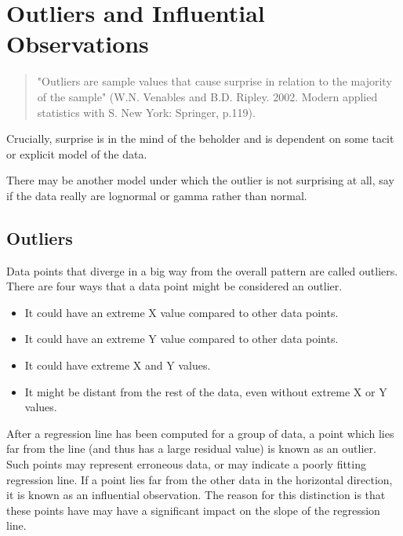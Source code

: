 \documentclass[residuals.tex]{subfiles}
\begin{document}
\newpage
\section{Outliers and Influential Observations}
\begin{quote}
	"Outliers are sample values that cause surprise in relation to the majority of the sample" (W.N. Venables and B.D. Ripley. 2002. Modern applied statistics with S. New York: Springer, p.119).
\end{quote}

Crucially, surprise is in the mind of the beholder and is dependent on some tacit or explicit model of the data. 

There may be another model under which the outlier is not surprising at all, say if the data really are lognormal or gamma rather than normal.
\subsection{Outliers}

Data points that diverge in a big way from the overall pattern are called outliers. There are four ways that a data point might be considered an outlier.

\begin{itemize}
	\item It could have an extreme X value compared to other data points.
	\item It could have an extreme Y value compared to other data points.
	\item It could have extreme X and Y values.
	\item It might be distant from the rest of the data, even without extreme X or Y values.
\end{itemize}

After a regression line has been computed for a group of data, a point which lies far from the line (and thus has a large residual value) is known as an outlier. Such points may represent erroneous data, or may indicate a poorly fitting regression line. If a point lies far from the other data in the horizontal direction, it is known as an influential observation. The reason for this distinction is that these points have may have a significant impact on the slope of the regression line.
\end{document}
